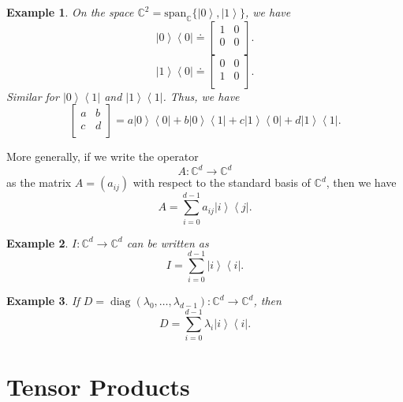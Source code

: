 \documentclass{article}
\newtheorem*{example}{Example}
\newcommand{\bbC}{\mathbb{C}}
\begin{document}
\begin{example}
		On the space $\mathbb{C}^2 = \text{span}_{\mathbb{C}} \{\left| 0 \right\rangle , \left| 1 \right\rangle \} $, we have
			\[
				\left| 0 \right\rangle \left\langle 0 \right| \doteq 
					\begin{bmatrix}
						1 & 0 \\
						0 & 0 \\
					\end{bmatrix}
			.\] 
			\[
				\left| 1 \right\rangle \left\langle 0 \right| \doteq
					\begin{bmatrix}
						0 & 0 \\
						1 & 0 \\
					\end{bmatrix}
			.\] 
			Similar for $\left| 0 \right\rangle \left\langle 1 \right| $ and $\left| 1 \right\rangle \left\langle 1 \right| $.
			Thus, we have
			\[
				\begin{bmatrix}
					a & b \\
					c & d \\
				\end{bmatrix}
				= a \left| 0 \right\rangle \left\langle 0 \right| + b \left| 0 \right\rangle \left\langle 1 \right|  + c \left| 1 \right\rangle  \left\langle 0 \right|  + d \left| 1 \right\rangle \left\langle 1 \right| 
			.\] 
\end{example}

More generally, if we write the operator
\[
A: \mathbb{C}^d \to \mathbb{C}^d
\] 
as the matrix $A = \left( a_{i j} \right)$ with respect to the standard basis of $\bbC^d$, then we have
\[
A = \sum_{i=0}^{d-1} a_{i j} \left| i \right\rangle  \left\langle j \right| .
\] 

\begin{example}
	$I: \mathbb{C}^d \to \mathbb{C}^d$ can be written as
	\[
		I = \sum_{i = 0}^{ d - 1} \left| i \right\rangle  \left\langle i \right| 
	.\] 
\end{example}

\begin{example}
	If $D = \operatorname{diag} \left( \lambda_0, \ldots, \lambda_{d - 1} \right) : \mathbb{C}^d \to \mathbb{C}^d$, then
	\[
		D = \sum_{i = 0}^{d - 1} \lambda_i \left| i \right\rangle  \left\langle i \right| 
	.\] 
\end{example}


\section{Tensor Products}
\end{document}
